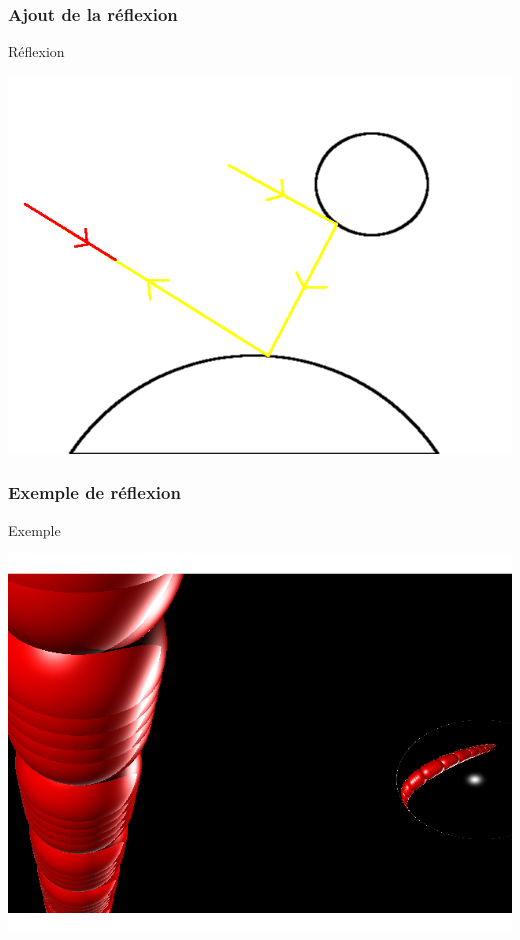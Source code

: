 \begin{frame}
	\frametitle{Ajout de la réflexion}
	\begin{block}{Réflexion}
	\begin{center}
		\includegraphics[scale=0.35]{reflection.png} 	
	\end{center}
	\end{block}
\end{frame}

\begin{frame}
	\frametitle{Exemple de réflexion}
	\begin{block}{Exemple}
	\begin{center}
		\includegraphics[scale=0.35]{brillance.png} 
	\end{center}
	\end{block}
\end{frame}

